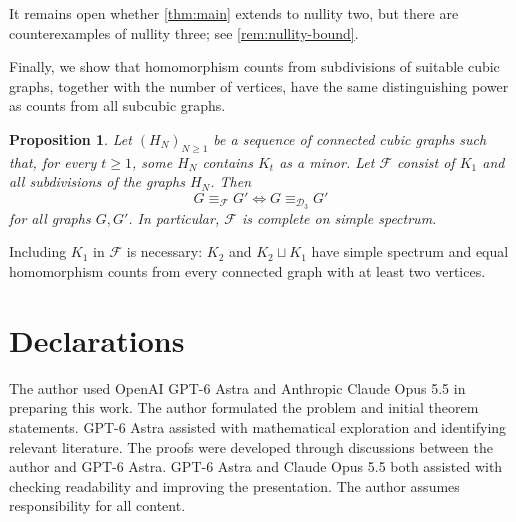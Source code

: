\documentclass[11pt,a4paper]{article}
\theoremstyle{plain}
\newtheorem{proposition}[theorem]{Proposition}
\theoremstyle{definition}
\newcommand{\calF}{\mathcal{F}}
\begin{document}
It remains open whether \cref{thm:main} extends to nullity two, but there
are counterexamples of nullity three; see \cref{rem:nullity-bound}.

Finally, we show that homomorphism counts from subdivisions of suitable
cubic graphs, together with the number of vertices, have the same
distinguishing power as counts from all subcubic graphs.
\begin{proposition}\label{prop:closure}
 Let $(H_N)_{N\geq1}$ be a sequence of connected cubic graphs such that,
 for every $t\geq1$, some $H_N$ contains $K_t$ as a minor.
 Let $\calF$ consist of $K_1$ and all subdivisions of the graphs $H_N$.
 Then
 \begin{equation}\label{eq:restriction-equivalence}
  G\equiv_{\calF}G'\Longleftrightarrow
  G\equiv_{\mathcal D_3}G'
 \end{equation}
 for all graphs $G,G'$. In particular, $\calF$ is complete on simple spectrum.
\end{proposition}
Including $K_1$ in $\calF$ is necessary: $K_2$ and $K_2\sqcup K_1$ have simple
spectrum and equal homomorphism counts from every connected graph with at least two vertices.





\section*{Declarations}

The author used OpenAI GPT-6 Astra and Anthropic Claude Opus 5.5 in
preparing this work. The author formulated the problem and initial
theorem statements. GPT-6 Astra assisted with mathematical exploration
and identifying relevant literature. The proofs were developed through
discussions between the author and GPT-6 Astra. GPT-6 Astra and Claude
Opus 5.5 both assisted with checking readability and improving the
presentation. The author assumes responsibility for all content.



\end{document}
